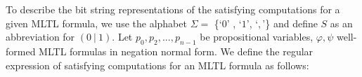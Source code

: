 \documentclass[runningheads]{llncs}
\renewcommand{\phi}{\varphi}
\begin{document}
To describe the bit string representations of the satisfying computations for a given MLTL formula, we use the alphabet $\Sigma =$ \{`$0$' , `$1$', `$,$'\} and define $S$ as an abbreviation for $(0 \ | \ 1)$.
Let $p_0, p_2, ..., p_{n-1}$ be propositional variables, $\phi, \psi$ well-formed MLTL formulas in negation normal form. We define the regular expression of satisfying computations for an MLTL formula as follows:\\
%
%
%
\end{document}
